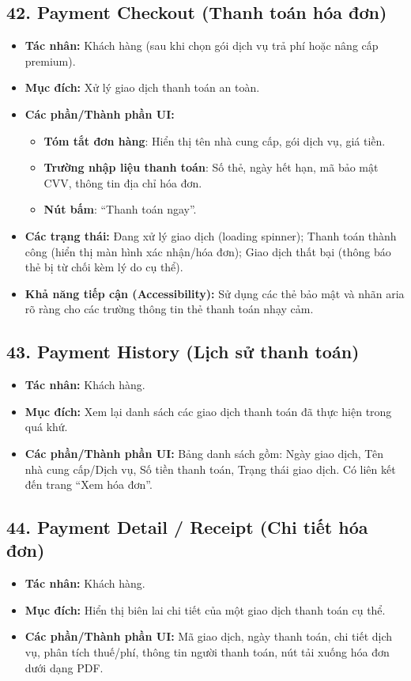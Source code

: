 \documentclass[11pt,a4paper]{article}
\begin{document}
\subsection{42. Payment Checkout (Thanh toán hóa đơn)}
\begin{itemize}
    \item \textbf{Tác nhân:} Khách hàng (sau khi chọn gói dịch vụ trả phí hoặc nâng cấp premium).
    \item \textbf{Mục đích:} Xử lý giao dịch thanh toán an toàn.
    \item \textbf{Các phần/Thành phần UI:}
    \begin{itemize}
        \item \textbf{Tóm tắt đơn hàng}: Hiển thị tên nhà cung cấp, gói dịch vụ, giá tiền.
        \item \textbf{Trường nhập liệu thanh toán}: Số thẻ, ngày hết hạn, mã bảo mật CVV, thông tin địa chỉ hóa đơn.
        \item \textbf{Nút bấm}: ``Thanh toán ngay''.
    \end{itemize}
    \item \textbf{Các trạng thái:} Đang xử lý giao dịch (loading spinner); Thanh toán thành công (hiển thị màn hình xác nhận/hóa đơn); Giao dịch thất bại (thông báo thẻ bị từ chối kèm lý do cụ thể).
    \item \textbf{Khả năng tiếp cận (Accessibility):} Sử dụng các thẻ bảo mật và nhãn aria rõ ràng cho các trường thông tin thẻ thanh toán nhạy cảm.
\end{itemize}

\subsection{43. Payment History (Lịch sử thanh toán)}
\begin{itemize}
    \item \textbf{Tác nhân:} Khách hàng.
    \item \textbf{Mục đích:} Xem lại danh sách các giao dịch thanh toán đã thực hiện trong quá khứ.
    \item \textbf{Các phần/Thành phần UI:} Bảng danh sách gồm: Ngày giao dịch, Tên nhà cung cấp/Dịch vụ, Số tiền thanh toán, Trạng thái giao dịch. Có liên kết đến trang ``Xem hóa đơn''.
\end{itemize}

\subsection{44. Payment Detail / Receipt (Chi tiết hóa đơn)}
\begin{itemize}
    \item \textbf{Tác nhân:} Khách hàng.
    \item \textbf{Mục đích:} Hiển thị biên lai chi tiết của một giao dịch thanh toán cụ thể.
    \item \textbf{Các phần/Thành phần UI:} Mã giao dịch, ngày thanh toán, chi tiết dịch vụ, phân tích thuế/phí, thông tin người thanh toán, nút tải xuống hóa đơn dưới dạng PDF.
\end{itemize}
\end{document}

